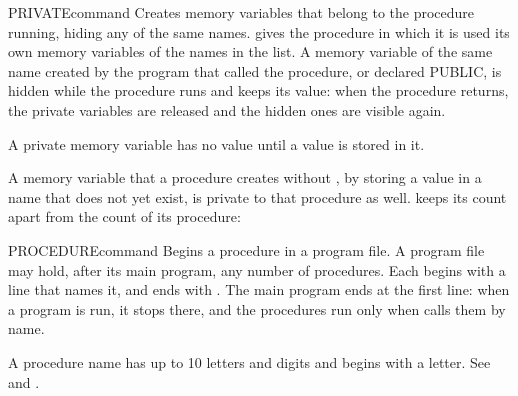 \begin{XbaseEntry}{PRIVATE}{command}
Creates memory variables that belong to the procedure running, hiding any of
the same names.
\Syntax
{}
\Usage
{} gives the procedure in which it is used its own memory variables
of the names in the list.  A memory variable of the same name created by the
program that called the procedure, or declared PUBLIC, is hidden while the
procedure runs and keeps its value: when the procedure returns, the private
variables are released and the hidden ones are visible again.

A private memory variable has no value until a value is stored in it.

A memory variable that a procedure creates without , by storing a
value in a name that does not yet exist, is private to that procedure as well.
\Examples
{} keeps its count apart from the count of its procedure:
\end{XbaseEntry}

\begin{XbaseEntry}{PROCEDURE}{command}
Begins a procedure in a program file.
\Syntax
{}
\Usage
A program file may hold, after its main program, any number of procedures.
Each begins with a  line that names it, and ends with
.  The main program ends at the first  line: when a
program is run, it stops there, and the procedures run only when
 calls them by name.

A procedure name has up to 10 letters and digits and begins with a letter.
\Examples
See  and .
\end{XbaseEntry}

